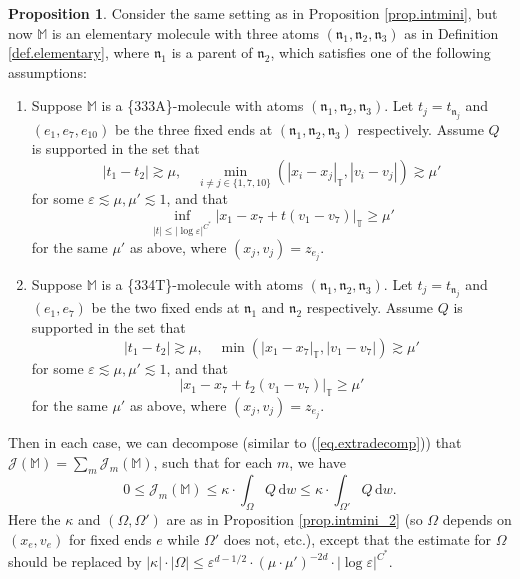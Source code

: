 \documentclass[10pt, reqno]{amsart}
\newcommand{\Mb}{\mathbb M}
\newcommand{\Tb}{\mathbb T}
\newcommand {\Jc}{\mathcal J}
\newcommand{\nf}{\mathfrak n}
\theoremstyle{definition}
\newtheorem{proposition}[theorem]{Proposition}
\theoremstyle{remark}
\numberwithin{equation}{section}
\begin{document}
\begin{proposition}\label{prop.intmini_3} Consider the same setting as in Proposition \ref{prop.intmini}, but now $\Mb$ is an elementary molecule with three atoms $(\nf_1,\nf_2,\nf_3)$ as in Definition \ref{def.elementary}, where $\nf_1$ is a parent of $\nf_2$, which satisfies one of the following assumptions:
\begin{enumerate}
\item\label{it.intmini_3_1} Suppose $\Mb$ is a \{333A\}-molecule with atoms $(\nf_1,\nf_2,\nf_3)$. Let $t_j=t_{\nf_j}$ and $(e_1,e_7,e_{10})$ be the three fixed ends at $(\nf_1,\nf_2,\nf_3)$ respectively. Assume $Q$ is supported in the set that
\begin{equation}\label{eq.intmini_3_1_1}|t_1-t_2|\gtrsim\mu,\quad \min_{i\neq j\in\{1,7,10\}}(|x_i-x_j|_\Tb,|v_i-v_j|)\gtrsim\mu'
\end{equation} for some $\varepsilon\lesssim\mu,\mu'\lesssim 1$, and that
\begin{equation}\label{eq.intmini_3_1_2}\inf_{|t|\leq |\log\varepsilon|^{C^*}}|x_1-x_7+t(v_1-v_7)|_\Tb\geq\mu'\end{equation} for the same $\mu'$ as above, where $(x_j,v_j)=z_{e_j}$.
\item\label{it.intmini_3_2} Suppose $\Mb$ is a \{334T\}-molecule with atoms $(\nf_1,\nf_2,\nf_3)$. Let $t_j=t_{\nf_j}$ and $(e_1,e_7)$ be the two fixed ends at $\nf_1$ and $\nf_2$ respectively. Assume $Q$ is supported in the set that
\begin{equation}\label{eq.intmini_3_2_1}|t_1-t_2|\gtrsim\mu,\quad \min(|x_1-x_7|_\Tb,|v_1-v_7|)\gtrsim\mu'
\end{equation} for some $\varepsilon\lesssim\mu,\mu'\lesssim 1$, and that \begin{equation}\label{eq.intmini_3_2_2}|x_1-x_7+t_2(v_1-v_7)|_\Tb\geq\mu'\end{equation} for the same $\mu'$ as above, where $(x_j,v_j)=z_{e_j}$.
\end{enumerate}
Then in each case, we can decompose (similar to (\ref{eq.extradecomp})) that $\Jc(\Mb)=\sum_m \Jc_m(\Mb)$, such that for each $m$, we have
\begin{equation}\label{eq.333_2}
0\leq\Jc_m(\Mb)\leq\kappa\cdot\int_\Omega Q\,\mathrm{d}w\leq\kappa\cdot\int_{\Omega'}Q\,\mathrm{d}w.
\end{equation} Here the $\kappa$ and $(\Omega,\Omega')$ are as in Proposition \ref{prop.intmini_2} (so $\Omega$ depends on $(x_e,v_e)$ for fixed ends $e$ while $\Omega'$ does not, etc.), except that the estimate for $\Omega$ should be replaced by $|\kappa|\cdot|\Omega|\leq \varepsilon^{d-1/2}\cdot (\mu\cdot\mu')^{-2d}\cdot|\log\varepsilon|^{C^*}$.
\end{proposition}
\end{document}
